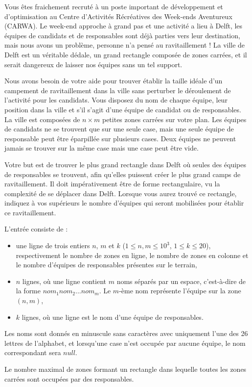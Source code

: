 \problemname{\problemyamlname}

Vous êtes fraichement recruté à un poste important de développement et
d'optimisation au Centre d'Activités Récréatives des Week-ends
Aventureux (CARWA). Le week-end approche à grand pas et une activité a lieu à Delft,
les équipes de candidats et de responsables sont déjà parties vers leur destination,
mais nous avons un problème, personne n'a pensé au ravitaillement !
La ville de Delft est un véritable dédale, un grand rectangle composée de zones carrées,
et il serait dangereux de laisser nos équipes sans un tel support.

Nous avons besoin de votre aide pour trouver établir la taille idéale d'un
campement de ravitaillement dans la ville sans perturber le déroulement de l'activité pour les candidats.
Vous disposez du nom de chaque équipe, leur position dans la ville et s'il s'agit d'une
équipe de candidat ou de responsables. La ville est composées de $n\times m$ petites zones carrées sur votre plan.
Les équipes de candidats ne se trouvent que sur une seule case, mais une seule équipe de responsable peut être éparpillée sur plusieurs cases.
Deux équipes ne peuvent jamais se trouver sur la même case mais une case peut être vide.

Votre but est de trouver le plus grand rectangle dans Delft où
seules des équipes de responsables se trouvent, afin qu'elles puissent créer le plus
grand camps de ravitaillement. Il doit impérativement être de forme rectangulaire, vu la complexité de se déplacer dans Delft.
Lorsque vous aurez trouvé ce rectangle, indiquez à vos supérieurs le nombre d'équipes qui seront mobilisées pour établir ce ravitaillement.

\begin{Input}
	L'entrée consiste de :
	\begin{itemize}
		\item une ligne de trois entiers $n$, $m$ et $k$ ($1\leq n,m \leq 10^3$, $1\leq k \leq 20$),
respectivement le nombre de zones en ligne, le nombre de zones en colonne et le nombre d'équipes de responsables présentes sur le terrain,
		\item $n$ lignes, où une ligne contient $m$ noms séparés par un espace, c'est-à-dire de la forme $nom_1 nom_2 ... nom_m$. Le $m$-ème nom représente l'équipe sur la zone $(n,m)$,
		\item $k$ lignes, où une ligne est le nom d'une équipe de responsables.
	\end{itemize}
	Les noms sont donnés en minuscule sans caractères avec uniquement l'une des 26 lettres de l'alphabet, et lorsqu'une case n'est occupée par aucune équipe, le nom correspondant sera $null$.
\end{Input}

\begin{Output}
	Le nombre maximal de zones formant un rectangle dans lequelle toutes les zones carrées sont occupées par des responsables.
\end{Output}
